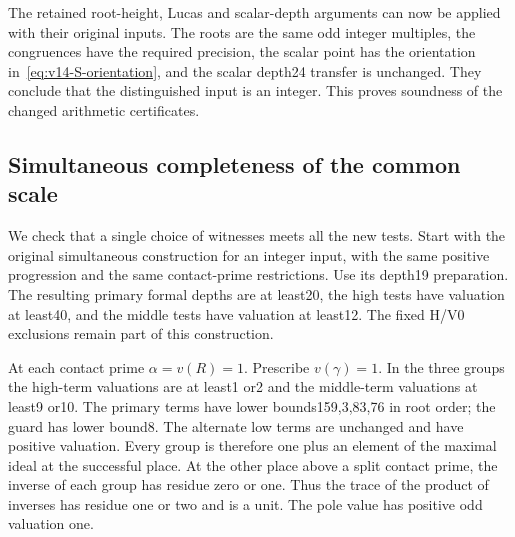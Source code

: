 The retained root-height, Lucas and scalar-depth arguments can
now be applied with their original inputs. The roots are the
same odd integer multiples, the congruences have the required
precision, the scalar point has the orientation
in~\eqref{eq:v14-S-orientation}, and the scalar depth24 transfer
is unchanged. They conclude that the distinguished input is
an integer. This proves soundness of the changed arithmetic
certificates.

\subsection{Simultaneous completeness of the common scale}
\label{subsec:v14-completeness}
We check that a single choice of witnesses meets all the new
tests. Start with the original simultaneous construction for
an integer input, with the same positive progression and the
same contact-prime restrictions. Use its depth19 preparation.
The resulting primary formal depths are at least20, the high
tests have valuation at least40, and the middle tests have
valuation at least12. The fixed H/V0 exclusions remain part of
this construction.

At each contact prime $\alpha=v(R)=1$. Prescribe $v(\gamma)=1$.
In the three groups the high-term valuations are at least1
or2 and the middle-term valuations at least9 or10. The primary
terms have lower bounds159,3,83,76 in root order; the guard has
lower bound8. The alternate low terms are unchanged and have
positive valuation. Every group is therefore one plus an
element of the maximal ideal at the successful place.
At the other place above a split contact prime, the inverse
of each group has residue zero or one. Thus the trace of the
product of inverses has residue one or two and is a unit.
The pole value has positive odd valuation one.

